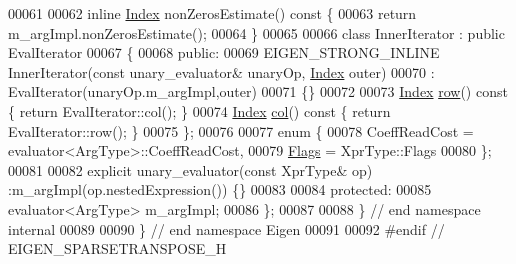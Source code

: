\begin{DoxyCode}
00061     
00062     \textcolor{keyword}{inline} \hyperlink{group___core___module_a554f30542cc2316add4b1ea0a492ff02}{Index} nonZerosEstimate()\textcolor{keyword}{ const }\{
00063       \textcolor{keywordflow}{return} m\_argImpl.nonZerosEstimate();
00064     \}
00065 
00066     \textcolor{keyword}{class }InnerIterator : \textcolor{keyword}{public} EvalIterator
00067     \{
00068     \textcolor{keyword}{public}:
00069       EIGEN\_STRONG\_INLINE InnerIterator(\textcolor{keyword}{const} unary\_evaluator& unaryOp, \hyperlink{group___core___module_a554f30542cc2316add4b1ea0a492ff02}{Index} outer)
00070         : EvalIterator(unaryOp.m\_argImpl,outer)
00071       \{\}
00072       
00073       \hyperlink{group___core___module_a554f30542cc2316add4b1ea0a492ff02}{Index} \hyperlink{group___sparse_core___module_ac0a5563ed3f243f013fb9d2c17e230d0}{row}()\textcolor{keyword}{ const }\{ \textcolor{keywordflow}{return} EvalIterator::col(); \}
00074       \hyperlink{group___core___module_a554f30542cc2316add4b1ea0a492ff02}{Index} \hyperlink{group___sparse_core___module_a8f4eaa3c3921ef3823ffc69ebcc356af}{col}()\textcolor{keyword}{ const }\{ \textcolor{keywordflow}{return} EvalIterator::row(); \}
00075     \};
00076     
00077     \textcolor{keyword}{enum} \{
00078       CoeffReadCost = evaluator<ArgType>::CoeffReadCost,
00079       \hyperlink{group___sparse_core___module_a726a12d2ba40a5f476c247c8f6db39d9ab5d909e7026be6ee6dccbbc629842a93}{Flags} = XprType::Flags
00080     \};
00081     
00082     \textcolor{keyword}{explicit} unary\_evaluator(\textcolor{keyword}{const} XprType& op) :m\_argImpl(op.nestedExpression()) \{\}
00083 
00084   \textcolor{keyword}{protected}:
00085     evaluator<ArgType> m\_argImpl;
00086 \};
00087 
00088 \} \textcolor{comment}{// end namespace internal}
00089 
00090 \} \textcolor{comment}{// end namespace Eigen}
00091 
00092 \textcolor{preprocessor}{#endif // EIGEN\_SPARSETRANSPOSE\_H}
\end{DoxyCode}
